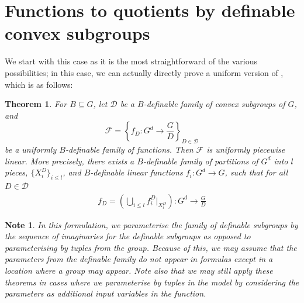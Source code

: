\documentclass[a4paper,11pt]{article}
\newtheorem{theorem}{Theorem}[section]
\newtheorem*{note}{Note}
\begin{document}
\section{Functions to quotients by definable convex subgroups}\label{convex section}
We start with this case as it is the most straightforward of the various possibilities; in this case, we can actually directly prove a uniform version of , which is as follows:
\begin{theorem}\label{Uniform main for convex}
    For $B\subseteq G$, let $\mathcal{D}$ be a $B$-definable family of convex subgroups of $G$, and $$\mathcal{F}= \left\{f_D:G^d\rightarrow \frac{G}{D}\right\}_{D\in\mathcal{D}}$$ be a uniformly $B$-definable family of functions. Then $\mathcal{F}$ is uniformly piecewise linear.
    More precisely, there exists a $B$-definable family of partitions of $G^d$ into $l$ pieces, $\{X_i^D\}_{i\leq l}$, and $B$-definable linear functions $f_{i}:G^d\rightarrow G$, such that for all $D\in\mathcal{D}$
    \begin{align*}
        f_D = (\bigcup\limits_{i\leq l} f_{i}^D|_{X_i^D}):G^d\rightarrow \frac{G}{D}
    \end{align*}
\end{theorem}
\begin{note}
    In this formulation, we parameterise the family of definable subgroups by the sequence of imaginaries for the definable subgroups as opposed to parameterising by tuples from the group. Because of this, we may assume that the parameters from the definable family do not appear in formulas except in a location where a group may appear. Note also that we may still apply these theorems in cases where we parameterise by tuples in the model by considering the parameters as additional input variables in the function.
\end{note}
\end{document}
